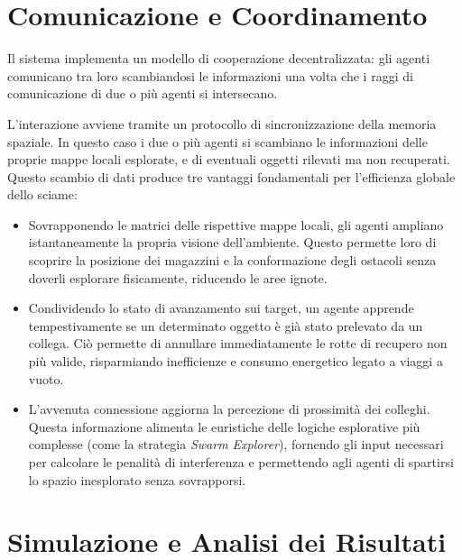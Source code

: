 \documentclass[11pt,a4paper]{article}
\begin{document}
\section{Comunicazione e Coordinamento}

Il sistema implementa un modello di cooperazione decentralizzata: gli agenti comunicano tra loro scambiandosi le informazioni una volta che i raggi di comunicazione di due o più agenti si intersecano. 

\vspace{0.3cm}
\noindent
L'interazione avviene tramite un protocollo di sincronizzazione della memoria spaziale. In questo caso i due o più agenti si scambiano le informazioni delle proprie mappe locali esplorate, e di eventuali oggetti rilevati ma non recuperati. Questo scambio di dati produce tre vantaggi fondamentali per l'efficienza globale dello sciame:

\begin{itemize}
    \item Sovrapponendo le matrici delle rispettive mappe locali, gli agenti ampliano istantaneamente la propria visione dell'ambiente. Questo permette loro di scoprire la posizione dei magazzini e la conformazione degli ostacoli senza doverli esplorare fisicamente, riducendo le aree ignote.
    
    \item Condividendo lo stato di avanzamento sui target, un agente apprende tempestivamente se un determinato oggetto è già stato prelevato da un collega. Ciò permette di annullare immediatamente le rotte di recupero non più valide, risparmiando inefficienze e consumo energetico legato a viaggi a vuoto.
    
    \item L'avvenuta connessione aggiorna la percezione di prossimità dei colleghi. Questa informazione alimenta le euristiche delle logiche esplorative più complesse (come la strategia \textit{Swarm Explorer}), fornendo gli input necessari per calcolare le penalità di interferenza e permettendo agli agenti di spartirsi lo spazio inesplorato senza sovrapporsi.
\end{itemize}

\section{Simulazione e Analisi dei Risultati}
\end{document}
